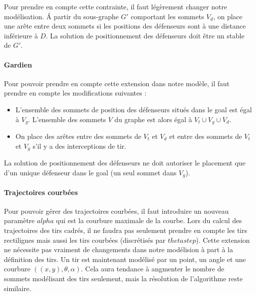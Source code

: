 \documentclass[12pt]{article}
\begin{document}
Pour prendre en compte cette contrainte, il faut légèrement changer notre modélisation. \'A partir du sous-graphe $G'$ comportant les sommets $V_d$, on place une arête entre deux sommets si les positions des défenseurs sont à une distance inférieure à $D$. La solution de positionnement des défenseurs doit être un stable de $G'$.



\paragraph{Gardien}
Pour pouvoir prendre en compte cette extension dans notre modèle, il faut prendre en compte les modifications suivantes :
\begin{itemize}
  \item L'ensemble des sommets de position des défenseurs situés dans le goal est égal à $V_g$. L'ensemble des sommets $V$ du graphe est alors égal à $V_t \cup V_g \cup V_d$.
  \item On place des arêtes entre des sommets de $V_t$ et $V_d$ et entre des sommets de $V_t$ et $V_g$ s'il y a des interceptions de tir.
\end{itemize}

La solution de positionnement des défenseurs ne doit autoriser le placement que d'un unique défenseur dans le goal (un seul sommet dans $V_g$).

\paragraph{Trajectoires courbées}
Pour pouvoir gérer des trajectoires courbées, il faut introduire un nouveau paramètre $alpha$ qui est la courbure maximale de la courbe. Lors du calcul des trajectoires des tirs cadrés, il ne faudra pas seulement prendre en compte les tirs rectilignes mais aussi les tirs courbées (discrétisés par $thetastep$).
Cette extension ne nécessite pas vraiment de changements dans notre modélision à part à la définition des tirs. Un tir est maintenant modélisé par un point, un angle et une courbure $((x,y), \theta, \alpha)$. Cela aura tendance à angmenter le nombre de sommets modélisant des tirs seulement, mais la résolution de l'algorithme reste similaire.
\end{document}
